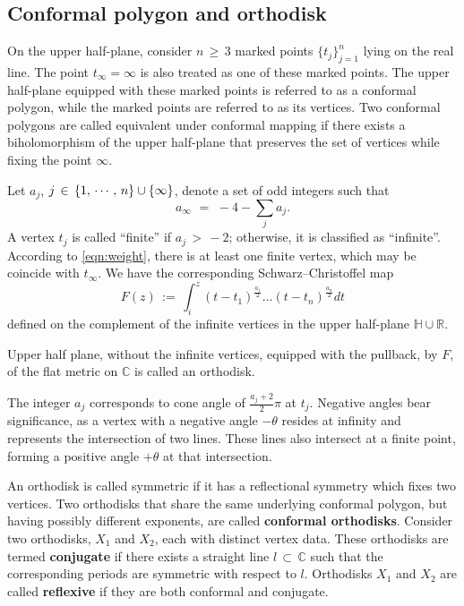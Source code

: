 \documentclass[12pt,epsfig,tikz,multi]{amsart}
\numberwithin{equation}{section}
\begin{document}
\subsection{Conformal polygon and orthodisk \cite{Weber1998TeichmullerTA}}

On the upper half-plane, consider $n \,\geq\, 3$ marked points $\{t_j\}_{j=1}^n$ lying on the real 
line. The point $t_\infty = \infty$ is also treated as one of these marked points. The 
upper half-plane equipped with these marked points is
referred to as a conformal polygon, while the marked points are referred to as its vertices.
Two conformal polygons are called equivalent under conformal mapping if there exists a biholomorphism
of the upper half-plane that preserves the set of vertices while fixing the point $\infty$.

Let $a_j$, $j\, \in\, \{1,\, \cdots,\, n\}\cup\lbrace\color{black} \infty\rbrace\color{black}$, denote a set of odd integers such that
\begin{equation}\label{eqn:weight}
a_\infty \,\,=\,\, -4 - \sum_{j} a_j.
\end{equation}
A vertex $t_j$ is called ``finite'' if $a_j \,>\,-2$; otherwise, it is classified as ``infinite''.
According to \ref{eqn:weight}, there is at least one finite vertex, which may be coincide with $t_\infty$.
We have the corresponding Schwarz--Christoffel map
\[
F(z) \,:=\, \int_{ i }^z (t - t_1)^{\frac{a_1}{2}} \ldots (t - t_n)^{\frac{a_n}{2}} dt
\]
defined on the complement of the infinite vertices in the upper half-plane $\mathbb{H} \cup \mathbb{R}$.

Upper half plane, without the infinite vertices, equipped with the
pullback, by $F$, of the flat metric on $\mathbb{C}$ is called an orthodisk.

The integer $a_j$ corresponds to cone angle of $\frac{a_j + 2}{2}\pi$ at $t_j$. Negative angles bear 
significance, as a vertex with a negative angle $-\theta$ resides at infinity and represents the 
intersection of two lines. These lines also intersect at a finite point, forming a positive angle
$+\theta$ at that intersection.

An orthodisk is called symmetric if it has a reflectional symmetry which fixes two vertices.
Two orthodisks that share the same underlying conformal polygon, but
having possibly different exponents, are called \textbf{conformal orthodisks}. Consider two orthodisks,
$X_1$ and $X_2$, each 
with distinct vertex data. These orthodisks are termed \textbf{conjugate} if there exists a straight line $l 
\,\subset\, \mathbb{C}$ such that the corresponding periods are symmetric with respect to $l$.
Orthodisks $X_1$  and $X_2$ are called \textbf{reflexive} if they are both conformal and conjugate.
\end{document}
